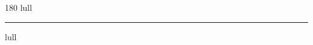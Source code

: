 
\begin{frame}
\begin{center}
\begin{turn}{180}
{\fontsize{2.5cm}{1em}\selectfont lull}
\end{turn}
\vspace{1em}\par  
\hrule
\vspace{1em}\par  
{\fontsize{2.5cm}{1em}\selectfont lull}
\end{center}
\end{frame}
